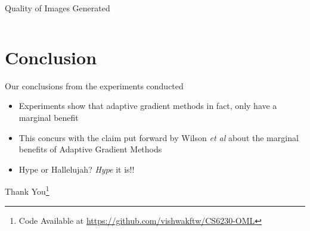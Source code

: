 \documentclass[10pt]{beamer}
\begin{document}
\begin{frame}{Quality of Images Generated}
\begin{columns}
\end{columns}
\end{frame}

\section{Conclusion}
\begin{frame}{Our conclusions from the experiments conducted}
\begin{itemize}
\item<1->{Experiments show that adaptive gradient methods in fact, only have a marginal benefit}
\item<2->{This concurs with the claim put forward by Wilson \textit{et al} about the marginal benefits of Adaptive Gradient Methods}
\item<3->{Hype or Hallelujah? \emph{Hype} it is!!}
\end{itemize}
\end{frame}

\begin{frame}
\Huge{Thank You\footnote{Code Available at \url{https://github.com/vishwakftw/CS6230-OML}}}
\end{frame}
\end{document}
